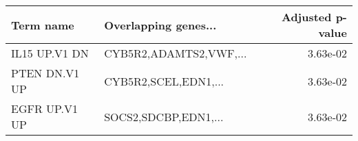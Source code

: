 \begin{tabular}{llr}
\toprule
    Term name &   Overlapping genes... &  Adjusted p-value \\
\midrule
IL15 UP.V1 DN & CYB5R2,ADAMTS2,VWF,... &          3.63e-02 \\
PTEN DN.V1 UP &   CYB5R2,SCEL,EDN1,... &          3.63e-02 \\
EGFR UP.V1 UP &   SOCS2,SDCBP,EDN1,... &          3.63e-02 \\
\bottomrule
\end{tabular}
